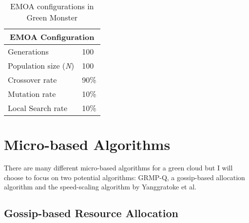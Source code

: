 \documentclass{sig-alternate}
\begin{document}
\begin{table}[tb]
\begin{center}
\begin{tabular}{|l|l|}
    \hline
    \multicolumn{2}{|c|}{\textbf{EMOA Configuration}} \\
    \hline
    Generations & 100 \\
    Population size (\emph{N}) & 100 \\
    Crossover rate & 90\% \\
    Mutation rate & 10\% \\
    Local Search rate & 10\% \\
    \hline
\end{tabular}
\caption{EMOA configurations in Green Monster}
\label{tab:EMOAConfig}
\end{center}
\end{table}



\section{Micro-based Algorithms} 
\label{sec:MicAl}

There are many different micro-based algorithms for a green cloud but I will choose to focus on two potential algorithms: GRMP-Q, a gossip-based allocation algorithm and the speed-scaling algorithm by Yanggratoke et al. 
\subsection{Gossip-based Resource Allocation}
\label{sec:GBRA}

\end{document}
